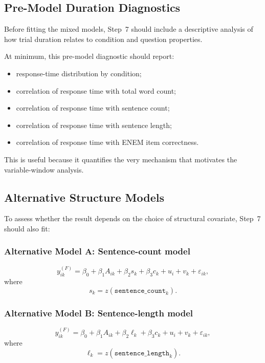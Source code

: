 \documentclass[11pt]{article}
\begin{document}
\subsection{Pre-Model Duration Diagnostics}
Before fitting the mixed models, Step~7 should include a descriptive analysis of how trial duration
relates to condition and question properties.

At minimum, this pre-model diagnostic should report:
\begin{itemize}
    \item response-time distribution by condition;
    \item correlation of response time with total word count;
    \item correlation of response time with sentence count;
    \item correlation of response time with sentence length;
    \item correlation of response time with ENEM item correctness.
\end{itemize}

This is useful because it quantifies the very mechanism that motivates the variable-window analysis.

\subsection{Alternative Structure Models}
To assess whether the result depends on the choice of structural covariate, Step~7 should also fit:

\subsubsection{Alternative Model A: Sentence-count model}
\begin{equation}
y^{(F)}_{ik}
=
\beta_0
+
\beta_1 A_{ik}
+
\beta_2 s_k
+
\beta_3 c_k
+
u_i
+
v_k
+
\varepsilon_{ik},
\end{equation}
where
\begin{equation}
s_k = z(\texttt{sentence\_count}_k).
\end{equation}

\subsubsection{Alternative Model B: Sentence-length model}
\begin{equation}
y^{(F)}_{ik}
=
\beta_0
+
\beta_1 A_{ik}
+
\beta_2 \ell_k
+
\beta_3 c_k
+
u_i
+
v_k
+
\varepsilon_{ik},
\end{equation}
where
\begin{equation}
\ell_k = z(\texttt{sentence\_length}_k).
\end{equation}
\end{document}
